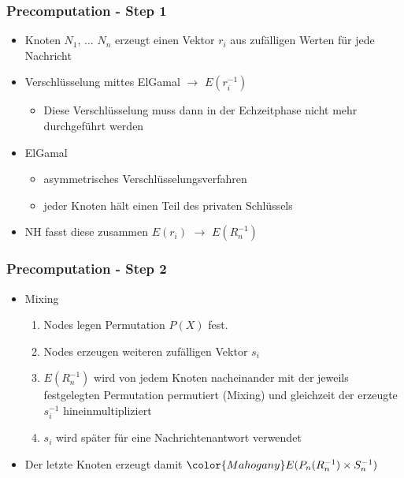 \documentclass[t, xcolor=dvipsnames]{beamer}
\begin{document}
\begin{frame}
	\frametitle{Precomputation - Step 1}
	
\begin{itemize}
				\item Knoten $N_1$, ... $N_n$ erzeugt einen Vektor $r_i$ aus zufälligen Werten für jede Nachricht

				\item Verschlüsselung mittes ElGamal $\rightarrow$ $E(r_i^{-1})$ 
				\begin{itemize}
					\item Diese Verschlüsselung muss dann in der Echzeitphase nicht mehr durchgeführt werden
				\end{itemize}
				\item ElGamal
				\begin{itemize}
					\item asymmetrisches Verschlüsselungsverfahren
					\item jeder Knoten hält einen Teil des privaten Schlüssels
				\end{itemize}
				\item NH fasst diese zusammen $E(r_i)$ $\rightarrow$ $E(R_n^{-1})$  
				
				\end{itemize}
	\vspace{\fill}
\end{frame}

\begin{frame}
	\frametitle{Precomputation - Step 2}
	\begin{itemize}
				\item Mixing
				\begin{enumerate}
					\item Nodes legen Permutation $P(X)$ fest.
					\item Nodes erzeugen weiteren zufälligen Vektor $s_i$
					\item $E(R_n^{-1})$ wird von jedem Knoten nacheinander mit der jeweils festgelegten Permutation permutiert (Mixing) und gleichzeit der erzeugte $s_i^{-1}$ hineinmultipliziert
					\item $s_i$ wird später für eine Nachrichtenantwort verwendet					
					\end{enumerate}
				\item Der letzte Knoten erzeugt damit $\color{Mahogany}E(P_n(R_n^{-1}) \times S_n^{-1})$
			

	\end{itemize}
	\vspace{\fill}
\end{frame}
\end{document}
